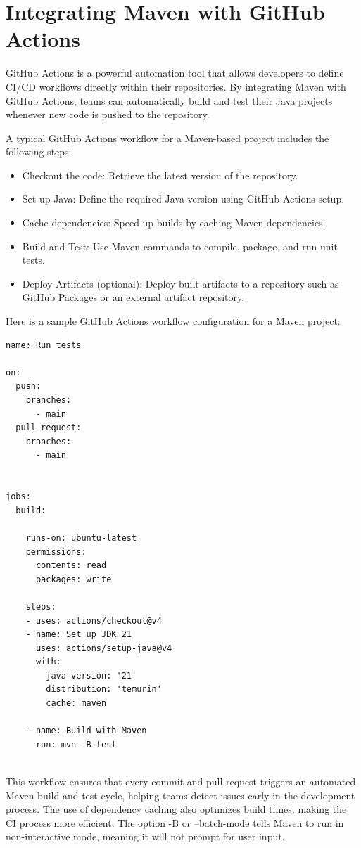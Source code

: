 \section{Integrating Maven with GitHub Actions}

GitHub Actions is a powerful automation tool that allows developers to define CI/CD workflows directly within their repositories. By integrating Maven with GitHub Actions, teams can automatically build and test their Java projects whenever new code is pushed to the repository.

A typical GitHub Actions workflow for a Maven-based project includes the following steps:
\begin{itemize}
\item Checkout the code: Retrieve the latest version of the repository.
\item Set up Java: Define the required Java version using GitHub Actions setup.
\item Cache dependencies: Speed up builds by caching Maven dependencies.
\item Build and Test: Use Maven commands to compile, package, and run unit tests.
\item Deploy Artifacts (optional): Deploy built artifacts to a repository such as GitHub Packages or an external artifact repository.
\end{itemize}

Here is a sample GitHub Actions workflow configuration for a Maven project:

\begin{lstlisting}
name: Run tests

on: 
  push:
    branches:
      - main
  pull_request:
    branches:
      - main
  

jobs:
  build:

    runs-on: ubuntu-latest
    permissions:
      contents: read
      packages: write

    steps:
    - uses: actions/checkout@v4
    - name: Set up JDK 21
      uses: actions/setup-java@v4
      with:
        java-version: '21'
        distribution: 'temurin'
        cache: maven

    - name: Build with Maven
      run: mvn -B test
      
\end{lstlisting}

This workflow ensures that every commit and pull request triggers an automated Maven build and test cycle, helping teams detect issues early in the development process. The use of dependency caching also optimizes build times, making the CI process more efficient.  The option -B or --batch-mode tells Maven to run in non-interactive mode, meaning it will not prompt for user input.


